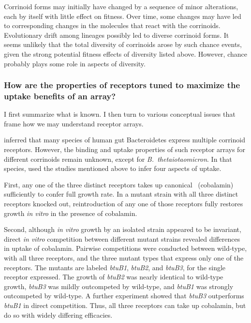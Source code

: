 \documentclass[\mydocfontsize]{article}
\begin{document}
\begin{multicols}{2}
 Corrinoid forms may initially have changed by a sequence of minor alterations, each by itself with little effect on fitness. Over time, some changes may have led to corresponding changes in the molecules that react with the corrinoids. Evolutionary drift among lineages possibly led to diverse corrinoid forms. It seems unlikely that the total diversity of corrinoids arose by such chance events, given the strong potential fitness effects of diversity listed above. However, chance probably plays some role in aspects of diversity. 

\subsubsection{How are the properties of receptors tuned to maximize the uptake benefits of an array?}

I first summarize what is known. I then turn to various conceptual issues that frame how we may understand receptor arrays.

\textcite{degnan14human} inferred that many species of human gut Bacteroidetes express multiple corrinoid receptors. However, the binding and uptake properties of such receptor arrays for different corrinoids remain unknown, except for \textit{B.\ thetaiotaomicron}. In that species, \textcite{degnan14human} used the studies mentioned above to infer four aspects of uptake.

First, any one of the three distinct receptors takes up canonical \bt\ (cobalamin) sufficiently to confer full growth rate. In a mutant strain with all three distinct receptors knocked out, reintroduction of any one of those receptors fully restores growth \textit{in vitro} in the presence of cobalamin.

Second, although \textit{in vitro} growth by an isolated strain appeared to be invariant, direct \textit{in vitro} competition between different mutant strains revealed differences in uptake of cobalamin. Pairwise competitions were conducted between wild-type, with all three receptors, and the three mutant types that express only one of the receptors. The mutants are labeled \textit{btuB1}, \textit{btuB2}, and \textit{btuB3}, for the single receptor expressed. The growth of \textit{btuB2} was nearly identical to wild-type growth, \textit{btuB3} was mildly outcompeted by wild-type, and \textit{btuB1} was strongly outcompeted by wild-type. A further experiment showed that \textit{btuB3} outperforms \textit{btuB1} in direct competition. Thus, all three receptors can take up cobalamin, but do so with widely differing efficacies.


\end{multicols}
\end{document}
